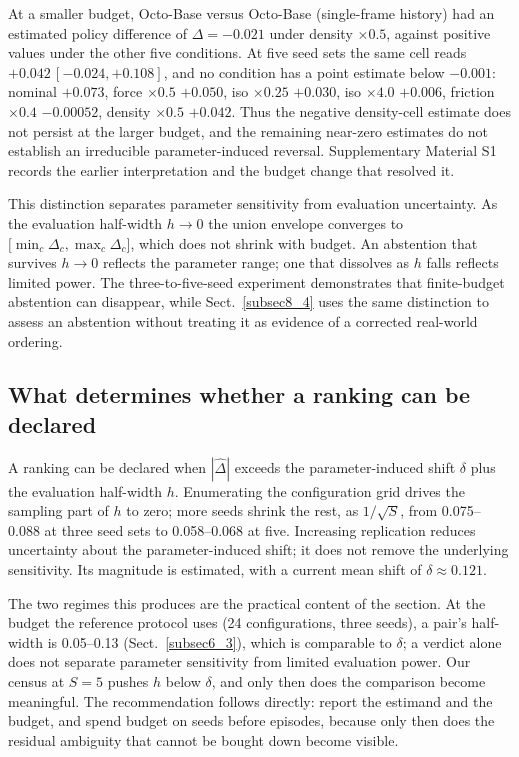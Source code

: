 \documentclass[pdflatex,iicol,sn-apa]{sn-jnl}
\theoremstyle{remark}
\begin{document}
At a smaller budget, Octo-Base versus Octo-Base (single-frame history) had an estimated
policy difference of $\Delta = -0.021$ under density $\times 0.5$, against positive values under
the other five conditions. At five seed sets the same cell reads
$+0.042\,[-0.024, +0.108]$, and no condition has a point estimate below $-0.001$:
nominal $+0.073$, force $\times 0.5$ $+0.050$, iso $\times 0.25$ $+0.030$, iso $\times 4.0$
$+0.006$, friction $\times 0.4$ $-0.00052$, density $\times 0.5$ $+0.042$. Thus the negative
density-cell estimate does not persist at the larger budget, and the remaining near-zero estimates
do not establish an irreducible parameter-induced reversal. Supplementary Material S1 records
the earlier interpretation and the budget change that resolved it.

This distinction separates parameter sensitivity from evaluation uncertainty. As the evaluation
half-width $h \to 0$ the union envelope converges to
$\big[\min_c \Delta_c, \max_c \Delta_c\big]$, which does not shrink with budget. An
abstention that survives $h \to 0$ reflects the parameter range; one that dissolves as $h$ falls
reflects limited power. The three-to-five-seed experiment demonstrates that finite-budget
abstention can disappear, while Sect.~\ref{subsec8_4} uses the same distinction to assess an
abstention without treating it as evidence of a corrected real-world ordering.

\subsection{What determines whether a ranking can be declared}\label{subsec7_6}

A ranking can be declared when $|\hat\Delta|$ exceeds the parameter-induced shift $\delta$
plus the evaluation half-width $h$. Enumerating the configuration grid drives the sampling
part of $h$ to zero; more seeds shrink the rest, as $1/\sqrt{S}$, from 0.075--0.088 at three seed
sets to 0.058--0.068 at five. Increasing replication reduces uncertainty about the
parameter-induced shift; it does not remove the underlying sensitivity. Its magnitude is estimated,
with a current mean shift of $\delta \approx 0.121$.

The two regimes this produces are the practical content of the section. At the budget the reference
protocol uses (24 configurations, three seeds), a pair's half-width is 0.05--0.13
(Sect.~\ref{subsec6_3}), which is comparable to $\delta$; a verdict alone does not separate parameter sensitivity
from limited evaluation power. Our census
at $S = 5$ pushes $h$ below $\delta$, and only then does the comparison become meaningful. The
recommendation follows directly: report the estimand and the budget, and spend budget on seeds
before episodes, because only then does the residual ambiguity that cannot be bought down
become visible.
\end{document}
